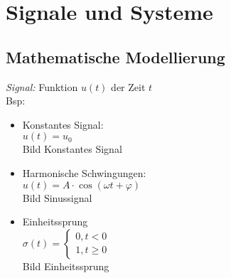



\section{Signale und Systeme}

\subsection{Mathematische Modellierung}
\emph{Signal: }Funktion $u(t)$ der Zeit $t$\\
Bsp: 
\begin{itemize}
  \item Konstantes Signal: \\
        $u(t) = u_0$ \\
        Bild Konstantes Signal
  \item Harmonische Schwingungen: \\
        $u(t) = A \cdot \cos(\omega t + \varphi)$ \\
        Bild Sinussignal
  \item Einheitssprung \\
        $\sigma(t) = 
        \left\lbrace 
        \begin{array}{l}
        0, t<0 \\
        1, t \geq 0
        \end{array} 
        \right. $\\
        Bild Einheitssprung
\end{itemize}

